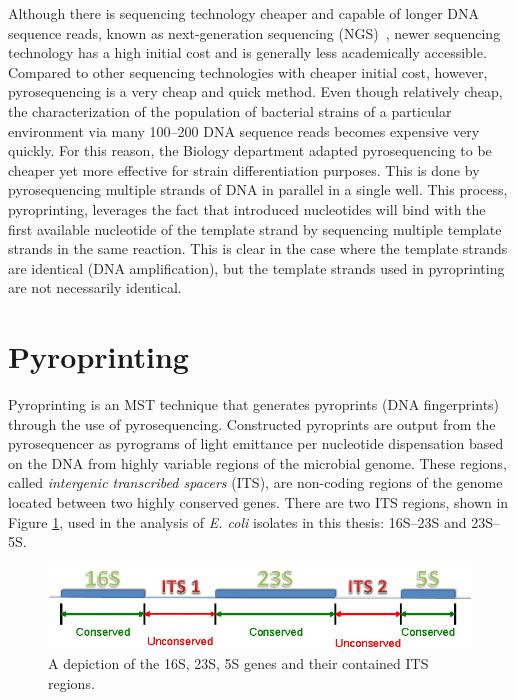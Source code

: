 \documentclass[12pt]{ucthesis}
\begin{document}
      Although there is sequencing technology cheaper and capable of longer DNA
      sequence reads, known as next-generation sequencing
      (NGS)~\cite{Mardis:NGS}, newer sequencing technology has a high initial
      cost and is generally less academically accessible. Compared to other
      sequencing technologies with cheaper initial cost, however,
      pyrosequencing is a very cheap and quick method. Even though relatively
      cheap, the characterization of the population of bacterial strains of a
      particular environment via many 100--200 DNA sequence reads becomes
      expensive very quickly. For this reason, the Biology department adapted
      pyrosequencing to be cheaper yet more effective for strain
      differentiation purposes. This is done by pyrosequencing multiple strands
      of DNA in parallel in a single well. This process, pyroprinting,
      leverages the fact that introduced nucleotides will bind with the first
      available nucleotide of the template strand by sequencing multiple
      template strands in the same reaction. This is clear in the case where
      the template strands are identical (DNA amplification), but the template
      strands used in pyroprinting are not necessarily identical.

   \section{Pyroprinting}\label{sec:pyroprinting}
      Pyroprinting is an MST technique that generates pyroprints (DNA
      fingerprints) through the use of pyrosequencing. Constructed pyroprints
      are output from the pyrosequencer as pyrograms of light emittance per
      nucleotide dispensation based on the DNA from highly variable regions of
      the microbial genome. These regions, called \textit{intergenic
      transcribed spacers} (ITS), are non-coding regions of the genome located
      between two highly conserved genes. There are two ITS regions, shown in
      Figure \ref{fig:its_regions}, used in the analysis of \textit{E. coli}
      isolates in this thesis: 16S--23S and 23S--5S.

      \begin{figure}[t]
         \centering
         \includegraphics[width=\columnwidth]{graphics/ITS_regions.eps}
         \caption{A depiction of the 16S, 23S, 5S genes and their contained ITS
                  regions.}
         \label{fig:its_regions}
      \end{figure}
\end{document}
